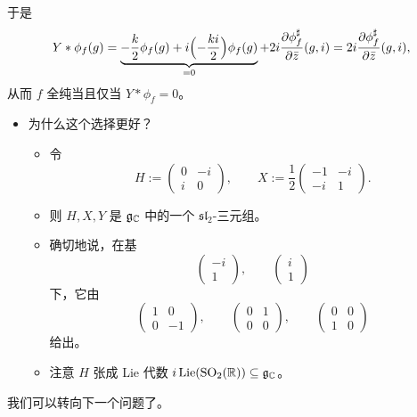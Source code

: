 于是
\[
Y*\phi_f(g)
=\underbrace{-\frac k2\phi_f(g)+i\Bigl(-\frac{ki}{2}\Bigr)\phi_f(g)}_{=0}
+2i\frac{\partial\phi_f^\sharp}{\partial\bar z}(g,i)
=2i\frac{\partial\phi_f^\sharp}{\partial\bar z}(g,i),
\]
从而 $f$ 全纯当且仅当 $Y*\phi_f=0$。
\begin{itemize}
\item 为什么这个选择更好？
\begin{itemize}
\item 令
\[
H:=\begin{pmatrix}0&-i\\i&0\end{pmatrix},\qquad
X:=\frac12\begin{pmatrix}-1&-i\\-i&1\end{pmatrix}.
\]
\item 则 $H,X,Y$ 是 $\mathfrak{g}_{\mathbb{C}}$ 中的一个 $\mathfrak{sl}_2$-三元组。
\item 确切地说，在基
\[
\begin{pmatrix}-i\\1\end{pmatrix},\qquad\begin{pmatrix}i\\1\end{pmatrix}
\]
下，它由
\[
\begin{pmatrix}1&0\\0&-1\end{pmatrix},\qquad
\begin{pmatrix}0&1\\0&0\end{pmatrix},\qquad
\begin{pmatrix}0&0\\1&0\end{pmatrix}
\]
给出。
\item 注意 $H$ 张成 Lie 代数 $i\operatorname{Lie}(\operatorname{SO}_2(\mathbb{R}))\subseteq\mathfrak{g}_{\mathbb{C}}$。
\end{itemize}
\end{itemize}

我们可以转向下一个问题了。

